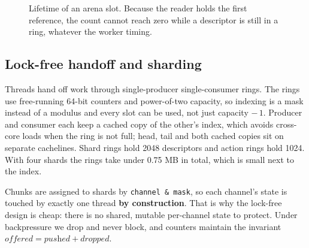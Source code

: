 \documentclass[conference]{IEEEtran}
\begin{document}
\begin{figure}[t]
\centering
{}
\caption{Lifetime of an arena slot. Because the reader holds the first reference, the count
cannot reach zero while a descriptor is still in a ring, whatever the worker timing.}
\label{fig:arena}
\end{figure}

\subsection{Lock-free handoff and sharding}

Threads hand off work through single-producer single-consumer rings. The rings use free-running
64-bit counters and power-of-two capacity, so indexing is a mask instead of a modulus and every
slot can be used, not just capacity $-\,1$. Producer and consumer each keep a cached copy of the
other's index, which avoids cross-core loads when the ring is not full; head, tail and both
cached copies sit on separate cachelines. Shard rings hold 2048 descriptors and action rings
hold 1024. With four shards the rings take under 0.75 MB in total, which is small next to the
index.

Chunks are assigned to shards by \texttt{channel \& mask}, so each channel's state is touched by
exactly one thread \textbf{by construction}. That is why the lock-free design is cheap: there is
no shared, mutable per-channel state to protect. Under backpressure we drop and never block, and
counters maintain the invariant $\textit{offered} = \textit{pushed} + \textit{dropped}$.
\end{document}
